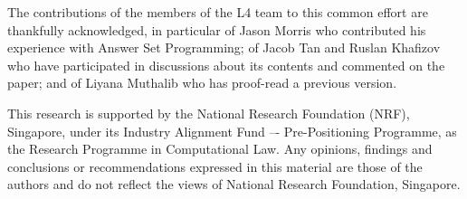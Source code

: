 \documentclass[]{ceurart}
\begin{document}
%





\begin{acknowledgments}
The contributions of the members of the L4 team to this common effort are
thankfully acknowledged, in particular of Jason Morris who contributed his
experience with Answer Set Programming; of Jacob Tan and Ruslan Khafizov who
have participated in discussions about its contents and commented on the
paper; and of Liyana Muthalib who has proof-read a previous version.

This research is supported by the National Research Foundation (NRF),
Singapore, under its Industry Alignment Fund –- Pre-Positioning Programme, as
the Research Programme in Computational Law. Any opinions, findings and
conclusions or recommendations expressed in this material are those of the
authors and do not reflect the views of National Research Foundation,
Singapore.
\end{acknowledgments}



\end{document}

